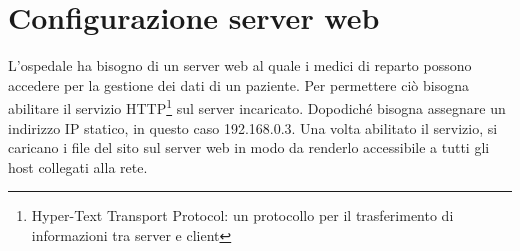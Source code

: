 \section{Configurazione server web}
\hspace{24pt}L'ospedale ha bisogno di un server web al quale i medici di reparto possono accedere per la gestione dei dati di un 
paziente. Per permettere ciò bisogna abilitare il servizio HTTP\footnote{Hyper-Text Transport Protocol: un protocollo 
per il trasferimento di informazioni tra server e client} sul server incaricato. Dopodiché bisogna assegnare un 
indirizzo IP statico, in questo caso 192.168.0.3. Una volta abilitato il servizio, si caricano i file del sito sul 
server web in modo da renderlo accessibile a tutti gli host collegati alla rete. 